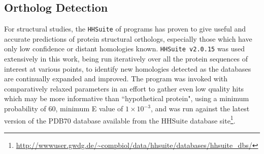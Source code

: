 %
%
%
%
%
%
%
%
%
%

\subsection{Ortholog Detection}
For structural studies, the \texttt{HHSuite} of programs has proven to give useful and accurate predictions of protein structural orthologs, especially those which have only low confidence or distant homologies known. \texttt{HHSuite v2.0.15} \citep{Remmert2012, Soding2005} was used extensively in this work, being run iteratively over all the protein sequences of interest at various points, to identify new homologies detected as the databases are continually expanded and improved. The program was invoked with comparatively relaxed parameters in an effort to gather even low quality hits which may be more informative than ``hypothetical protein", using a minimum probability of 60, minimum E value of $1\times10^{-3}$, and was run against the latest version of the PDB70 database available from the HHSuite database site\footnote{\url{http://wwwuser.gwdg.de/~compbiol/data/hhsuite/databases/hhsuite_dbs/}}.



